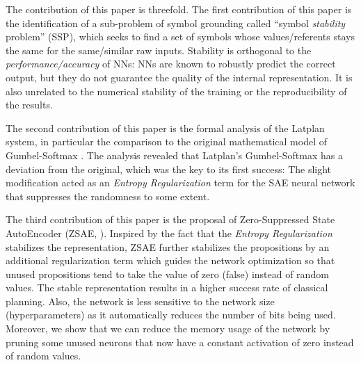 The contribution of this paper is threefold.
The first contribution of this paper is the identification of a sub-problem of symbol grounding
called ``symbol \emph{stability} problem'' (SSP), which seeks to find a set of symbols
whose values/referents stays the same for the same/similar raw inputs.
Stability is orthogonal to the \emph{performance/accuracy} of NNs:
NNs are known to robustly predict the correct output, but they do not guarantee
the quality of the internal representation.
It is also unrelated to the numerical stability of the training or the reproducibility of the results.

The second contribution of this paper is the formal analysis of the Latplan system,
in particular the comparison to the original mathematical model of Gumbel-Softmax
\cite{jang2016categorical}.
The analysis revealed that Latplan's Gumbel-Softmax has a deviation from
the original, which was the key to its first success: The slight
modification acted as an \emph{Entropy Regularization} term for the SAE neural
network that suppresses the randomness to some extent.

The third contribution of this paper is
the proposal of Zero-Suppressed State AutoEncoder (ZSAE, ).
Inspired by the fact that the \emph{Entropy Regularization} stabilizes the representation,
ZSAE further stabilizes the propositions 
by an additional regularization term which
guides the network optimization so that unused propositions tend to 
take the value of zero (false) instead of random values.
% 
The stable representation results in a higher success rate of classical planning.
Also, the network is less sensitive to the network size (hyperparameters)
as it automatically reduces the number of bits being used.
Moreover, we show that we can reduce the memory usage of the network
by pruning some unused neurons
that now have a constant activation of zero instead of random values.



